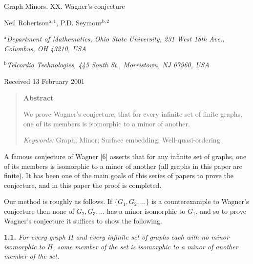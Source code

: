 {\centering
{\Large Graph Minors. XX. Wagner's conjecture\par}\medskip

Neil Robertson$^{\mathrm{a}, 1}$, P.D. Seymour$^{\mathrm{b}, 2}$\par
$^{\mathrm{a}}$\textit{Department of Mathematics, Ohio State University, 231 West 18th Ave., Columbus, OH 43210, USA}\par
$^{\mathrm{b}}$\textit{Telcordia Technologies, 445 South St., Morristown, NJ 07960, USA}\par
Received 13 February 2001\par
}
\begin{quote}
\textbf{Abstract}

We prove Wagner's conjecture, that for every infinite set of finite graphs, one of its members is isomorphic to a minor of another.

\textit{Keywords:} Graph; Minor; Surface embedding; Well-quasi-ordering
\end{quote}


A famous conjecture of Wagner [6] asserts that for any infinite set of graphs, one of its members is isomorphic to a minor of another (all graphs in this paper are finite). It has been one of the main goals of this series of papers to prove the conjecture, and in this paper the proof is completed.

Our method is roughly as follows. If $\{G_1, G_2, \ldots\}$ is a counterexample to Wagner's conjecture then none of $G_2, G_3, \ldots$ has a minor isomorphic to $G_1$, and so to prove Wagner's conjecture it suffices to show the following.

\textbf{1.1.} \textit{For every graph $H$ and every infinite set of graphs each with no minor isomorphic to $H$, some member of the set is isomorphic to a minor of another member of the set.}%
%
